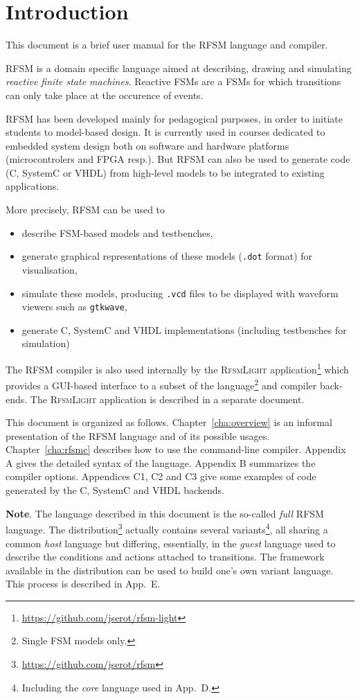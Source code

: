 \chapter{Introduction}
\label{chap:intro}

This document is a brief user manual for the RFSM language and compiler.

\medskip
RFSM is a domain specific language aimed at describing, drawing and simulating \emph{reactive finite state
  machines}. Reactive FSMs are a FSMs for which transitions can only take place at the occurence of
events.

\medskip
RFSM has been developed mainly for pedagogical purposes, in order to initiate students to
model-based design. It is currently used in courses dedicated to embedded system design both on
software and hardware platforms (microcontrolers and FPGA resp.). But RFSM can also be used to
generate code (C, SystemC or VHDL) from high-level models to be integrated to existing applications.

More precisely, RFSM can be used to
\begin{itemize}
\item describe FSM-based models and testbenches,
\item generate graphical representations of these models (\verb|.dot| format) for visualisation,
\item simulate these models, producing \verb|.vcd| files to be displayed with waveform viewers such
  as \texttt{gtkwave},
\item generate C, SystemC and VHDL implementations (including testbenches for simulation)
\end{itemize}

\medskip
The RFSM compiler is also used internally by the \textsc{RfsmLight}
application\footnote{\url{https://github.com/jserot/rfsm-light}} which provides a GUI-based interface to a
subset of the language\footnote{Single FSM models only.} and compiler back-ends. The
\textsc{RfsmLight} application is described in a separate document.

\medskip
This document is organized as follows.
Chapter~\ref{cha:overview} is an informal presentation of the RFSM language and of its
possible usages. Chapter~\ref{cha:rfsmc} describes how to use the command-line
compiler. Appendix A 
gives the detailed syntax of the language. Appendix B summarizes the compiler options. Appendices
C1, C2 and C3 give some examples of code generated by the C, SystemC and VHDL backends.

\medskip
\textbf{Note}. The language described in this document is the so-called \emph{full} RFSM language. The
distribution\footnote{\url{https://github.com/jserot/rfsm}} actually contains several
variants\footnote{Including the \emph{core} language used in App.~D.}, all
sharing a common \emph{host} language but differing, essentially, in the \emph{guest} language used to describe
the conditions and actions attached to transitions. The framework available in the distribution
can be used to build one's own variant language. This process is described in
App.~E. 

